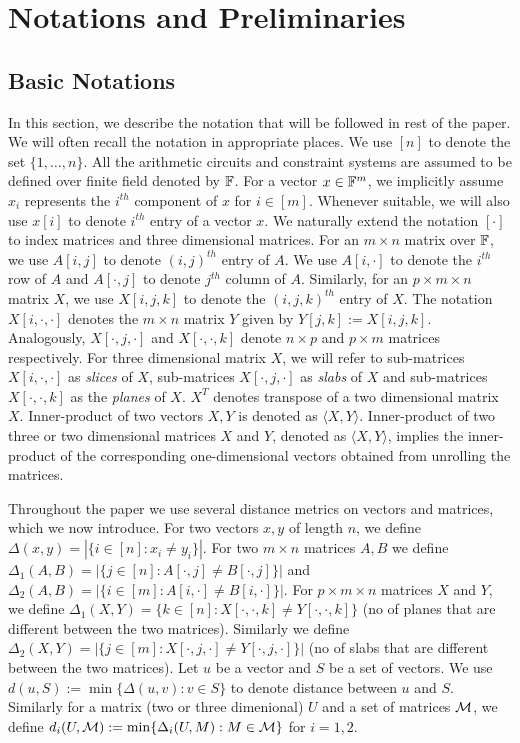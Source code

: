 \section{Notations and Preliminaries}\label{sec:prelims}
\subsection{Basic Notations}\label{sec:basicnotation}
In this section, we describe the notation that will be followed in rest of the
paper. We will often recall the notation in appropriate places. 
We use $[n]$ to
denote the set $\{1,\ldots,n\}$. All the arithmetic circuits and constraint
systems are assumed to be defined over finite field denoted by $\mathbb{F}$. For a
vector $x\in \mathbb{F}^m$, we implicitly assume $x_i$ represents the $i^{th}$
component of $x$ for $i\in [m]$. Whenever suitable, we will also use $x[i]$ to
denote $i^{th}$ entry of a vector $x$. We naturally extend the notation $[\cdot]$ to
index matrices and three dimensional matrices. For an $m\times n$ matrix over
$\mathbb{F}$, we use $A[i,j]$ to denote $(i,j)^{th}$ entry of $A$. We use $A[i,\cdot]$
to denote the $i^{th}$ row of $A$ and $A[\cdot,j]$ to denote $j^{th}$ column of
$A$. Similarly, for an $p\times m\times n$  matrix $X$, we use $X[i,j,k]$ to
denote the $(i,j,k)^{th}$ entry of $X$. The notation $X[i,\cdot,\cdot]$ denotes
the $m\times n$ matrix $Y$ given by $Y[j,k] := X[i,j,k]$. 
Analogously,
$X[\cdot,j,\cdot]$ and $X[\cdot,\cdot,k]$ denote $n\times p$ and $p\times m$
matrices respectively. For three dimensional
matrix $X$, we will refer to sub-matrices $X[i,\cdot,\cdot]$ as {\em slices} of
$X$, sub-matrices $X[\cdot,j,\cdot]$ as {\em slabs}  of $X$ and sub-matrices $X[\cdot,\cdot,k]$ as the {\em planes} of $X$. 
$X^T$ denotes transpose of a  two dimensional matrix $X$. Inner-product of two vectors $X,Y$ is denoted as $\langle X,Y\rangle$.
Inner-product of two three or two dimensional  matrices $X$ and $Y$, denoted as 
$\langle X,Y\rangle$,  implies the inner-product of the corresponding one-dimensional vectors obtained from unrolling  the matrices.


Throughout the paper we use several distance metrics on vectors and matrices,
which we now introduce. For two vectors $x,y$ of length $n$, we define
$\Delta(x,y)=|\{i\in [n]: x_i\neq y_i\}|$. For two $m\times n$ matrices $A,B$ we
define $\Delta_1(A,B)=|\{j\in [n]: A[\cdot,j]\neq B[\cdot,j]\}|$ and
$\Delta_2(A,B)=|\{i\in [m]: A[i,\cdot]\neq B[i,\cdot]\}|$. For $p\times m\times
n$ matrices $X$ and $Y$, we define $\Delta_1(X,Y)=\{k\in
[n]:X[\cdot,\cdot,k]\neq Y[\cdot,\cdot,k]\}$ (no of planes that are different between the two matrices). Similarly we define $\Delta_2(X,Y)
= |\{j\in [m]: X[\cdot,j,\cdot]\neq Y[\cdot,j,\cdot]\}|$  (no of slabs that are different between the two matrices). Let $u$ be a vector
and $S$ be a set of vectors. We use $d(u,S) := \min\{\Delta(u,v):v\in S\}$ to
denote distance between $u$ and $S$. Similarly for a matrix (two or three
dimenional) $U$ and a set of matrices $\mathcal{M}$, we define $d_i(U,\mathcal{M}) :=
\min\{\Delta_i(U,M): M\in \mathcal{M}\}$ for $i=1,2$.





